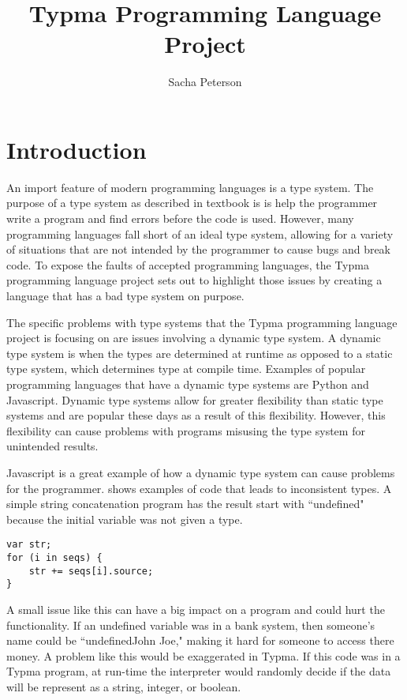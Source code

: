 \documentclass[10pt,twocolumn]{article}
\title{Typma Programming Language Project}
\author{Sacha Peterson}
\affiliation{Occidental College}
\begin{document}
\maketitle

\section{Introduction}

An import feature of modern programming languages is a type system. The purpose of a type system as described in textbook is is help the programmer write a program and find errors before the code is used. However, many programming languages fall short of an ideal type system, allowing for a variety of situations that are not intended by the programmer to cause bugs and break code. To expose the faults of accepted programming languages, the Typma programming language project sets out to highlight those issues by creating a language that has a bad type system on purpose.

The specific problems with type systems that the Typma programming language project is focusing on are issues involving a dynamic type system. A dynamic type system is when the types are determined at runtime as opposed to a static type system, which determines type at compile time. Examples of popular programming languages that have a dynamic type systems are Python and Javascript. Dynamic type systems allow for greater flexibility than static type systems and are popular these days as a result of this flexibility. However, this flexibility can cause problems with programs misusing the type system for unintended results.

Javascript is a great example of how a dynamic type system can cause problems for the programmer. \textcite{Pradel2014TypeDevil} shows examples of code that leads to inconsistent types. A simple string concatenation program has the result start with ``undefined" because the initial variable was not given a type.

\begin{lstlisting}
var str;
for (i in seqs) {
	str += seqs[i].source;
}
\end{lstlisting}

A small issue like this can have a big impact on a program and could hurt the functionality. If an undefined variable was in a bank system, then someone's name could be ``undefinedJohn Joe," making it hard for someone to access there money. A problem like this would be exaggerated in Typma. If this code was in a Typma program, at run-time the interpreter would randomly decide if the data will be represent as a string, integer, or boolean.
\end{document}
